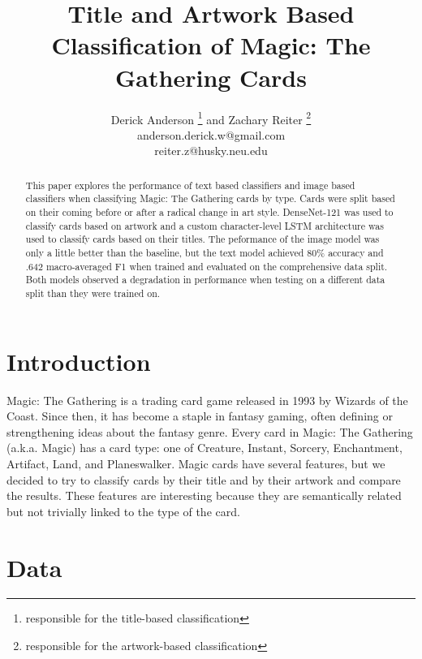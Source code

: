 \documentclass[letterpaper]{article} %
\begin{document}
%
\title{Title and Artwork Based Classification of Magic: The Gathering Cards}
\author{Derick Anderson \thanks{responsible for the title-based classification}
  and Zachary Reiter \thanks{responsible for the artwork-based classification}\\
  anderson.derick.w@gmail.com\\
  reiter.z@husky.neu.edu
}
\maketitle

\begin{abstract}
This paper explores the performance
of text based classifiers and image based classifiers
when classifying Magic: The Gathering cards by type.
Cards were split based on
their coming before or after a radical change in art style.
DenseNet-121 was used to classify cards based on artwork
and a custom character-level LSTM architecture
was used to classify cards based on their titles.
The peformance of the image model was only a little better than the baseline,
but the text model achieved 80\% accuracy and .642 macro-averaged F1
when trained and evaluated on the comprehensive data split.
Both models observed a degradation in performance when testing
on a different data split than they were trained on.
\end{abstract}


\section{Introduction}

Magic: The Gathering is a trading card game
released in 1993 by Wizards of the Coast.
Since then, it has become a staple in fantasy gaming,
often defining or strengthening ideas about the fantasy genre.
Every card in Magic: The Gathering (a.k.a. Magic) has a card type:
one of Creature, Instant, Sorcery, Enchantment, Artifact, Land, and Planeswalker.
Magic cards have several features,
but we decided to try to classify cards by their title
and by their artwork and compare the results.
These features are interesting
because they are semantically related
but not trivially linked to the type of the card.

\section{Data}
\end{document}
